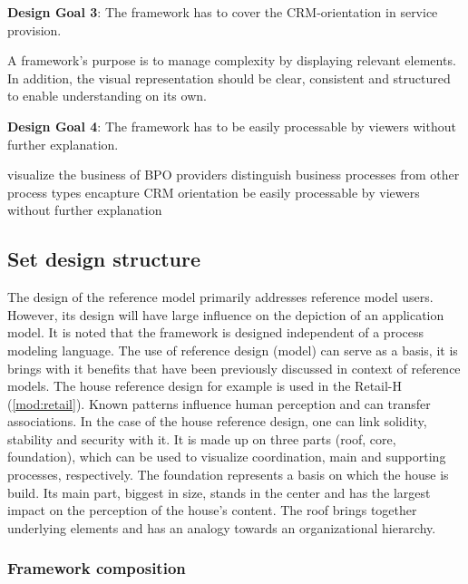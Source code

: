 	\hfill\begin{minipage}{\dimexpr\textwidth-1.2cm}
	\textbf{Design Goal 3}: The framework has to cover the CRM-orientation in service provision. 
\end{minipage}

A framework's purpose is to manage complexity by displaying relevant elements. In addition, the visual representation should be clear, consistent and structured to enable understanding on its own. 

	\hfill\begin{minipage}{\dimexpr\textwidth-1.2cm}
	\textbf{Design Goal 4}: The framework has to be easily processable by viewers without further explanation. 
\end{minipage}


	visualize the business of BPO providers
	distinguish business processes from other process types
	encapture CRM orientation 
	be easily processable by viewers without further explanation
	
	
	
	\subsection{Set design structure}
	
	The design of the reference model primarily addresses reference model users. However, its design will have large influence on the depiction of an application model. It is noted that the framework is designed independent of a process modeling language. The use of reference design (model) can serve as a basis, it is brings with it benefits that have been previously discussed in context of reference models. The house reference design for example is used in the Retail-H (\ref{mod:retail}). Known patterns influence human perception \citep{kroeber1997} and can transfer associations. In the case of the house reference design, one can link solidity, stability and security \citep[]{Meise2001} with it. It is made up on three parts (\viz roof, core, foundation), which can be used to visualize coordination, main and supporting processes, respectively. The foundation represents a basis on which the house is build. Its main part, biggest in size, stands in the center and has the largest impact on the perception of the house's content. The roof brings together underlying elements and has an analogy towards an organizational hierarchy. 
	
	\subsubsection{Framework composition}
	
